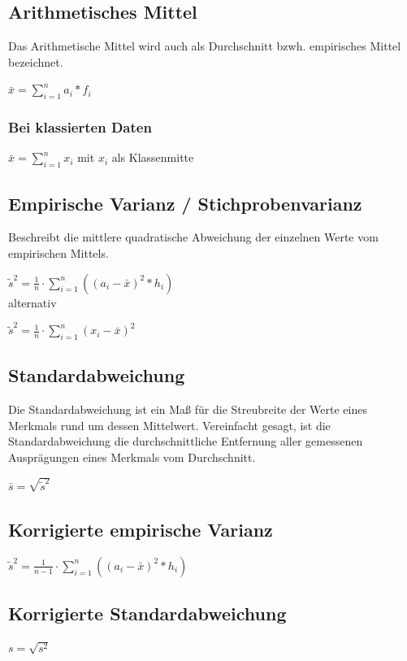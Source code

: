 \documentclass{article}
\begin{document}
\subsection{Arithmetisches Mittel}
Das Arithmetische Mittel wird auch als Durchschnitt bzwh. empirisches Mittel bezeichnet.

$
	\bar{x} = \sum_{i=1}^n a_i * f_i
$

\subsubsection{Bei klassierten Daten}

$
\bar{x} = \sum_{i=1}^n x_i
$
mit $ x_i $ als Klassenmitte

\subsection{Empirische Varianz / Stichprobenvarianz}
Beschreibt die mittlere quadratische Abweichung der einzelnen Werte vom empirischen Mittels.

	$
	\tilde{s}^2
	=
	\frac{1}{n} \cdot
	\sum_{i=1}^n (
	(a_i - \bar{x})^2* h_i)
	$
\\
alternativ

$
\tilde{s}^2 = \frac{1}{n} \cdot \sum_{i=1}^n (x_i - \bar{x})^2
$


\subsection{Standardabweichung}
 Die Standardabweichung ist ein Maß für die Streubreite der Werte eines Merkmals rund um dessen Mittelwert.
Vereinfacht gesagt, ist die Standardabweichung die durchschnittliche Entfernung aller gemessenen Ausprägungen eines Merkmals vom Durchschnitt.

$
\bar{s} = \sqrt{\tilde{s}^2}
$

\subsection{Korrigierte empirische Varianz}

$
\tilde{s}^2 = \frac{1}{n-1} \cdot \sum_{i=1}^n ((a_i - \bar{x})^2* h_i)
$

\subsection{Korrigierte Standardabweichung}

$
s = \sqrt{s^2}
$





\end{document}
